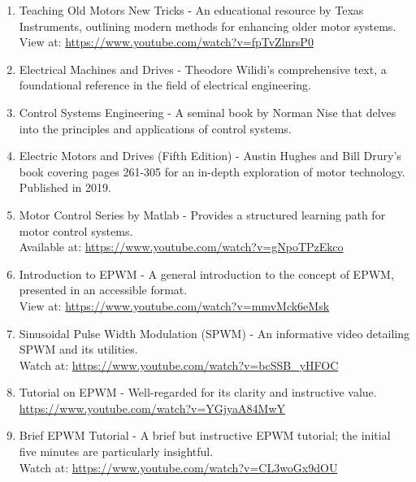\begin{enumerate}
    \item Teaching Old Motors New Tricks - An educational resource by Texas Instruments, outlining modern methods for enhancing older motor systems.\\
          View at: \url{https://www.youtube.com/watch?v=fpTvZlnrsP0}

    \item Electrical Machines and Drives - Theodore Wilidi's comprehensive text, a foundational reference in the field of electrical engineering.

    \item Control Systems Engineering - A seminal book by Norman Nise that delves into the principles and applications of control systems.

    \item Electric Motors and Drives (Fifth Edition) - Austin Hughes and Bill Drury’s book covering pages 261-305 for an in-depth exploration of motor technology. Published in 2019.

    \item Motor Control Series by Matlab - Provides a structured learning path for motor control systems.\\
          Available at: \url{https://www.youtube.com/watch?v=gNpoTPzEkco}


    \item Introduction to EPWM - A general introduction to the concept of EPWM, presented in an accessible format.\\
          View at: \url{https://www.youtube.com/watch?v=mmvMck6eMsk}

    \item Sinusoidal Pulse Width Modulation (SPWM) - An informative video detailing SPWM and its utilities.\\
          Watch at: \url{https://www.youtube.com/watch?v=bcSSB_yHFOC}

    \item Tutorial on EPWM - Well-regarded for its clarity and instructive value.\\
          \url{https://www.youtube.com/watch?v=YGjyaA84MwY}

    \item Brief EPWM Tutorial - A brief but instructive EPWM tutorial; the initial five minutes are particularly insightful.\\
          Watch at: \url{https://www.youtube.com/watch?v=CL3woGx9dOU}


\end{enumerate}
